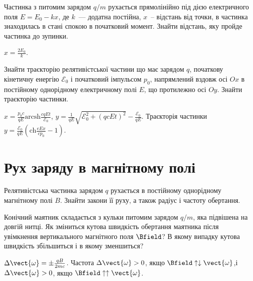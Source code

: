 \begin{problem}
Частинка з питомим зарядом $q/m$ рухається  прямолінійно під дією електричного поля $E = E_0 - kx$, де $k$~--- додатна постійна, $x$~-- відстань від точки, в частинка знаходилась в стані спокою в початковий момент. Знайти відстань, яку пройде частинка до зупинки.
\begin{solution}
	$x = \frac{2E_0}{k}$.
\end{solution}
\end{problem}

\begin{problem}
Знайти траєкторію релятивістської частини що має зарядом $q$, початкову кінетичну енергію $\mathcal{E}_0$ і початковий імпульсом $p_0$, напрямлений вздовж осі $Ox$
в постійному однорідному електричному полі $E$, що протилежно осі $Oy$. Знайти траєкторію частинки.
\begin{solution}
	$x = \frac{p_0c}{qE} \mathrm{arcsh}\frac{cqEt}{\mathcal{E}_0}$, $y = \frac{1}{qE}\sqrt{\mathcal{E}_0^2 + (qcEt)^2} - \frac{\mathcal{E}_0}{qE}$. Траєкторія частинки $y = \frac{\mathcal{E}_0}{qE} \left( \mathrm{ch}\frac{eEx}{cp_0} - 1\right) $.
\end{solution}
\end{problem}

\section{Рух заряду в магнітному полі}

\begin{problem}
Релятивістська частинка зарядом $q$ рухається в постійному однорідному магнітному полі $B$. Знайти закони її руху, а також радіус і частоту обертання.
\end{problem}

\begin{problem}
Конічний маятник складається з кульки питомим зарядом $q/m$,  яка підвішена на довгій нитці. Як зміниться кутова швидкість обертання маятника після увімкнення вертикального магнітного поля $\Bfield$?
В якому випадку кутова швидкість збільшиться і в якому зменшиться?
\begin{solution}
	$\Delta\vect{\omega} = \pm\frac{qB}{2mc}$. Частота $\Delta\vect{\omega}>0$, якщо $\Bfield \uparrow\downarrow \vect{\omega}$,і
	$\Delta\vect{\omega}>0$, якщо $\Bfield \uparrow\uparrow \vect{\omega}$.
\end{solution}
\end{problem}

